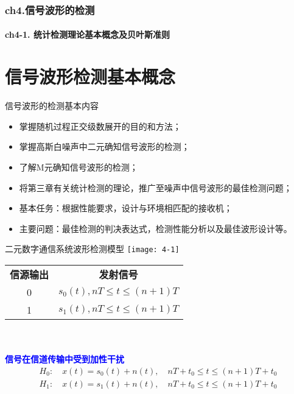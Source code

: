 \begin{frame}[shrink]
  \frametitle{ch4.信号波形的检测}
  \framesubtitle{ch4-1. 统计检测理论基本概念及贝叶斯准则}
  \tableofcontents[hideallsubsections]
\end{frame}

\section{信号波形检测基本概念}

\begin{frame}{信号波形的检测基本内容}
\begin{itemize}
	\setlength{\itemsep}{.5cm}
	\item 掌握随机过程正交级数展开的目的和方法；
	\item 掌握高斯白噪声中二元确知信号波形的检测；
	\item 了解M元确知信号波形的检测；
	\item 将第三章有关统计检测的理论，推广至噪声中信号波形的最佳检测问题；
	\item 基本任务：根据性能要求，设计与环境相匹配的接收机；
	\item 主要问题：最佳检测的判决表达式，检测性能分析以及最佳波形设计等。	
\end{itemize}
\end{frame}

\begin{frame}{二元数字通信系统波形检测模型}
\centering
\texttt{[image: 4-1]}\\
\begin{tabular}{cc}
	\textbf{信源输出} &\textbf{发射信号} \\ 
	0 & $s_0(t), nT\le t\le (n+1)T$ \\
	1 & $s_1(t), nT\le t\le (n+1)T$
\end{tabular} \\
~\\
\textbf{\textcolor{blue}{信号在信道传输中受到加性干扰}}
\begin{align*}
H_0: \quad x(t)=s_0(t)+n(t), \quad nT+t_0\le t\le (n+1)T+t_0\\
H_1: \quad x(t)=s_1(t)+n(t), \quad nT+t_0\le t\le (n+1)T+t_0
\end{align*}
\end{frame}

